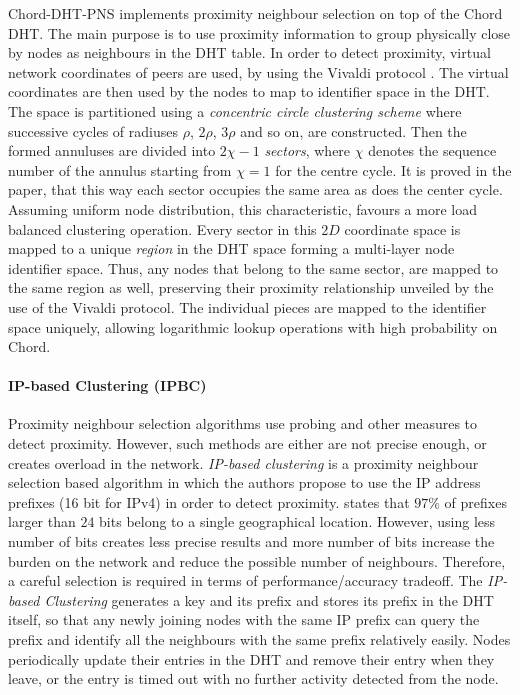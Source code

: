 \documentclass[acmcsur]{acmtrans2m}
\begin{document}
Chord-DHT-PNS \cite{hancong_pnsbased_2006} implements proximity neighbour
selection on top of the Chord DHT. The main purpose is to use proximity
information to group physically close by nodes as neighbours in the DHT table.
In order to detect proximity, virtual network coordinates of peers are used, by
using the Vivaldi protocol \cite{cox_vivaldi_2004}. The virtual coordinates are
then used by the nodes to map to identifier space in the DHT. The space is
partitioned using a \emph{concentric circle clustering scheme} where successive
cycles of radiuses $\rho$, $2\rho$, $3\rho$ and so on, are constructed. Then the
formed annuluses are divided into $2\chi-1$ \emph{sectors}, where $\chi$ denotes
the sequence number of the annulus starting from $\chi = 1$ for the centre
cycle. It is proved in the paper, that this way each sector occupies the same
area as does the center cycle. Assuming uniform node distribution, this
characteristic, favours a more load balanced clustering operation. Every sector
in this $2D$ coordinate space is mapped to a unique \emph{region} in the DHT
space forming a multi-layer node identifier space.  Thus, any nodes that belong
to the same sector, are mapped to the same region as well, preserving their
proximity relationship unveiled by the use of the Vivaldi protocol. The
individual pieces are mapped to the identifier space uniquely, allowing
logarithmic lookup operations with high probability on Chord.

\paragraph*{\bf IP-based Clustering (IPBC)}
Proximity neighbour selection algorithms use probing and other measures
to detect proximity. However, such methods are either are not precise enough, or
creates overload in the network. \emph{IP-based clustering}
\cite{karwaczynski_ipbc_2007} is a proximity neighbour selection based
algorithm in which the authors propose to use the IP address prefixes (16 bit
for IPv4) in order to detect proximity.  \cite{freedman_iploc_2005} states that
$97\%$ of prefixes larger than $24$ bits belong to a single geographical
location. However, using less number of bits creates less precise results and
more number of bits increase the burden on the network and reduce the possible
number of neighbours. Therefore, a careful selection is required in terms of
performance/accuracy tradeoff. The {\em IP-based Clustering} generates a key and
its prefix and stores its prefix in the DHT itself, so that any newly joining
nodes with the same IP prefix can query the prefix and identify all the
neighbours with the same prefix relatively easily. Nodes periodically update
their entries in the DHT and remove their entry when they leave, or the entry is
timed out with no further activity detected from the node.
\end{document}

